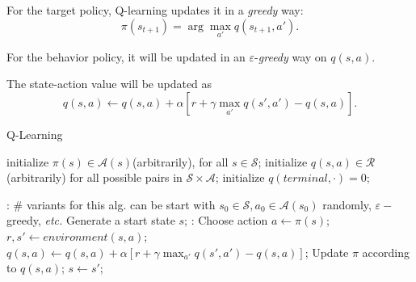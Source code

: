 \documentclass{progartcn}
\begin{document}
			For the target policy, Q-learning updates it in a \textit{greedy} way:
				\[\pi(s_{t+1})=\arg\max_{a'}q(s_{t+1},a').\]
			
			For the behavior policy, it will be updated in an $\varepsilon$-\textit{greedy} way on $q(s,a)$. 

			The state-action value will be updated as
			\[q(s,a)\gets q(s,a)+\alpha[r+\gamma\max_{a'}q(s',a')-q(s,a)].\]

			\begin{algorithm}[H]
			\caption{Q-Learning}
			\label{alg: Q-Learning}
			\begin{algorithmic}[1]
			\State initialize $\pi(s)\in \mathcal{A}(s)$(arbitrarily), for all $s\in \mathcal{S}$; initialize $q(s,a)\in\mathcal{R}$(arbitrarily) for all possible pairs in $\mathcal{S}\times\mathcal{A}$; initialize $q(terminal,\cdot)=0$;
	        
            :
            	\Statex \# variants for this alg. can be start with $s_0\in\mathcal{S},a_0\in\mathcal{A}(s_0)$ randomly, $\varepsilon-$greedy, \textit{etc.}
            	\State Generate a start state $s$;
            	:
					\State Choose action $a\gets\pi(s)$;
            		\State $r,s'\gets environment(s,a)$;
            		\State $q(s,a)\gets q(s,a)+\alpha[r+\gamma\max_{a'} q(s',a')-q(s,a)]$;
            		\State Update $\pi$ according to $q(s,a)$;
            		\State $s\gets s'$;
            	\EndWhile
            \EndFor
	        \end{algorithmic}
	        \end{algorithm}
\end{document}
